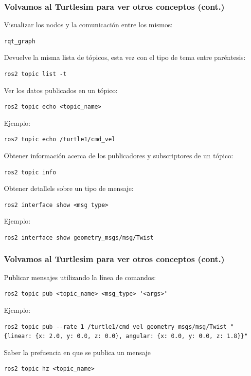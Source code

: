 \begin{frame}[fragile]
    \frametitle{Volvamos al Turtlesim para ver otros conceptos (cont.)}
	\footnotesize
	
Visualizar los nodos y la comunicación entre los mismos:
\begin{lstlisting}[style=bash]  
rqt_graph
\end{lstlisting}

Devuelve la misma lista de tópicos, esta vez con el tipo de tema entre paréntesis:
\begin{lstlisting}[style=bash]  
ros2 topic list -t
\end{lstlisting}
    
Ver los datos publicados en un tópico:
\begin{lstlisting}[style=bash]  
ros2 topic echo <topic_name>
\end{lstlisting}
    
Ejemplo:
\begin{lstlisting}[style=bash]  
ros2 topic echo /turtle1/cmd_vel
\end{lstlisting}
    
Obtener información acerca de los publicadores y subscriptores de un tópico:
\begin{lstlisting}[style=bash]  
ros2 topic info
\end{lstlisting}
    
Obtener detallels sobre un tipo de mensaje:
\begin{lstlisting}[style=bash]  
ros2 interface show <msg type>
\end{lstlisting}    

Ejemplo:
\begin{lstlisting}[style=bash]  
ros2 interface show geometry_msgs/msg/Twist
\end{lstlisting}    

\end{frame}

\begin{frame}[fragile]
	\frametitle{Volvamos al Turtlesim para ver otros conceptos (cont.)}
Publicar mensajes utilizando la línea de comandos:
\begin{lstlisting}[style=bash]  
ros2 topic pub <topic_name> <msg_type> '<args>'
\end{lstlisting}    
Ejemplo:
\begin{lstlisting}[style=bash]  
ros2 topic pub --rate 1 /turtle1/cmd_vel geometry_msgs/msg/Twist "{linear: {x: 2.0, y: 0.0, z: 0.0}, angular: {x: 0.0, y: 0.0, z: 1.8}}"
\end{lstlisting}    
Saber la prefuencia en que se publica un mensaje
\begin{lstlisting}[style=bash]  
ros2 topic hz <topic_name>
\end{lstlisting}
    
\end{frame}

